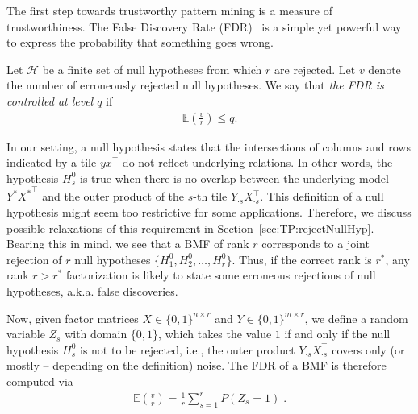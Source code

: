 The first step towards trustworthy pattern mining is a measure of trustworthiness. 
The False Discovery Rate (FDR)~\citep{benjamini1995controlling} is a simple yet powerful way to express the probability that something goes wrong.
\begin{definition}[FDR]
Let $\mathcal{H}$ be a finite set of null hypotheses from which $r$ are rejected. Let $v$ denote the number of erroneously rejected null hypotheses. We say that \emph{the FDR is controlled at level $q$} if
\begin{align*}
\mathbb{E}\left(\frac{v}{r}\right)\leq q.
\end{align*}
\end{definition}
In our setting, a null hypothesis states that the intersections of columns and rows indicated by a tile $yx^\top$ do not reflect underlying relations. In other words, the hypothesis $H_s^0$ is true when there is no overlap between the underlying model $Y^*{X^*}^\top$ and the outer product of the $s$-th tile $Y_{\cdot s}X_{\cdot s}^\top$. This definition of a null hypothesis might seem too restrictive for some applications. Therefore, we discuss possible relaxations of this requirement in Section~\ref{sec:TP:rejectNullHyp}. 
Bearing this in mind, we see that a BMF of rank $r$ corresponds to a joint rejection of $r$ null hypotheses $\{H_1^0,H_2^0,\dots,H_r^0\}$. 
Thus, if the correct rank is $r^*$, any rank $r>r^*$ factorization is likely to state some erroneous rejections of null hypotheses, a.k.a. false discoveries. 

Now, given factor matrices $X\in \{0,1\}^{n\times r}$ and $Y\in\{0,1\}^{m\times r}$, we define a random variable $Z_s$ with domain $\{0,1\}$, which takes the value $1$ if and only if the null hypothesis $H_s^0$ is not to be rejected, i.e., the outer product $Y_{\cdot s}X_{\cdot s}^\top $ covers only (or mostly -- depending on the definition) noise. The FDR of a BMF is therefore computed via
\begin{align}
\mathbb{E}\left(\frac{v}{r}\right) = \frac{1}{r}\sum_{s=1}^rP(Z_s=1)\;.\label{eq:FDRZ}
\end{align}
